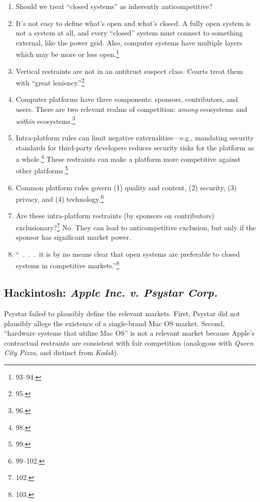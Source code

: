 \begin{enumerate}
    \item Should we treat ``closed systems'' as inherently anticompetitive?
    \item It's not easy to define what's open and what's closed. A fully open 
    system is not a system at all, and every ``closed'' system must connect to 
    something external, like the power grid. Also, computer systems have 
    multiple layers which may be more or less open.\footnote{93--94.}
    \item Vertical restraints are not in an antitrust suspect class. Courts 
    treat them with ``great leniency.''\footnote{95.}
    \item Computer platforms have three components: sponsors, contributors, 
    and users. There are two relevant realms of competition: \emph{among} 
    ecosystems and \emph{within} ecosystems.\footnote{96.}
    \item Intra-platform rules can limit negative externalities---e.g., 
    mandating security standards for third-party developers reduces security 
    risks for the platform as a whole.\footnote{98.} These restraints can make 
    a platform more competitive against other platforms.\footnote{99.}
    \item Common platform rules govern (1) quality and content, (2) security, 
    (3) privacy, and (4) technology.\footnote{99--102.}
    \item Are these intra-platform restraints (by sponsors on contributors) 
    exclusionary?\footnote{102.} No. They can lead to anticompetitive 
    exclusion, but only if the sponsor has significant market power.
    \item ``~.~.~.~it is by no means clear that open systems are preferable to 
    closed systems in competitive markets.''\footnote{103.}
\end{enumerate}

\subsection{Hackintosh: \emph{Apple Inc. v. Psystar Corp.}}

Psystar failed to plausibly define the relevant markets. First, Psystar did 
not plausibly allege the existence of a single-brand Mac OS market. Second, 
``hardware systems that utilize Mac OS'' is not a relevant market because 
Apple's contractual restraints are consistent with fair competition (analogous 
with \emph{Queen City Pizza}, and distinct from \emph{Kodak}).

